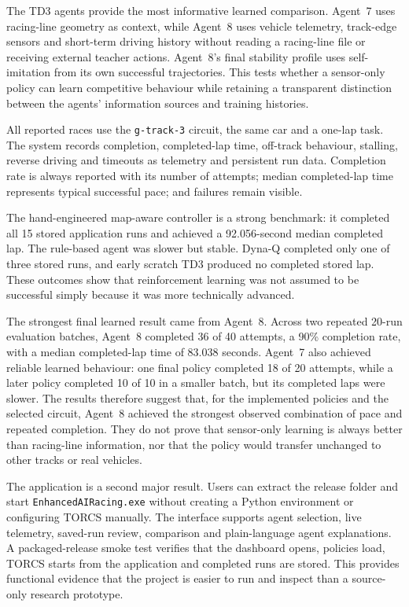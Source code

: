 The TD3 agents provide the most informative learned comparison. Agent~7 uses racing-line geometry as context, while Agent~8 uses vehicle telemetry, track-edge sensors and short-term driving history without reading a racing-line file or receiving external teacher actions. Agent~8's final stability profile uses self-imitation from its own successful trajectories. This tests whether a sensor-only policy can learn competitive behaviour while retaining a transparent distinction between the agents' information sources and training histories.

All reported races use the \texttt{g-track-3} circuit, the same car and a one-lap task. The system records completion, completed-lap time, off-track behaviour, stalling, reverse driving and timeouts as telemetry and persistent run data. Completion rate is always reported with its number of attempts; median completed-lap time represents typical successful pace; and failures remain visible.

The hand-engineered map-aware controller is a strong benchmark: it completed all 15 stored application runs and achieved a 92.056-second median completed lap. The rule-based agent was slower but stable. Dyna-Q completed only one of three stored runs, and early scratch TD3 produced no completed stored lap. These outcomes show that reinforcement learning was not assumed to be successful simply because it was more technically advanced.

The strongest final learned result came from Agent~8. Across two repeated 20-run evaluation batches, Agent~8 completed 36 of 40 attempts, a 90\% completion rate, with a median completed-lap time of 83.038 seconds. Agent~7 also achieved reliable learned behaviour: one final policy completed 18 of 20 attempts, while a later policy completed 10 of 10 in a smaller batch, but its completed laps were slower. The results therefore suggest that, for the implemented policies and the selected circuit, Agent~8 achieved the strongest observed combination of pace and repeated completion. They do not prove that sensor-only learning is always better than racing-line information, nor that the policy would transfer unchanged to other tracks or real vehicles.

The application is a second major result. Users can extract the release folder and start \texttt{EnhancedAIRacing.exe} without creating a Python environment or configuring TORCS manually. The interface supports agent selection, live telemetry, saved-run review, comparison and plain-language agent explanations. A packaged-release smoke test verifies that the dashboard opens, policies load, TORCS starts from the application and completed runs are stored. This provides functional evidence that the project is easier to run and inspect than a source-only research prototype.

